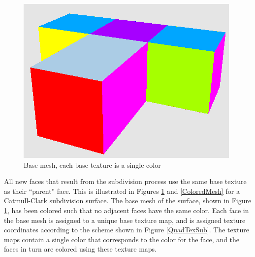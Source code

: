 \documentclass[10pt,twocolumn]{article}
\begin{document}

\begin{figure}
\begin{center}
\includegraphics[scale=0.5]{basemesh.png}
\caption{Base mesh, each base texture is a single color}
\label{ColoredBaseMesh}
\end{center}
\end{figure}

All new faces that result from the subdivision process use the same base 
texture as their ``parent'' face.  This is illustrated in Figures 
\ref{ColoredBaseMesh} and \ref{ColoredMesh} for a Catmull-Clark \cite{Catmull:1978:RGB} subdivision 
surface.  The base mesh of the surface, shown in Figure \ref{ColoredBaseMesh}, 
has been colored such that no adjacent faces have the same color.  
Each face in the base mesh is assigned to a unique base texture map, 
and is assigned texture coordinates according to the scheme shown in Figure \ref{QuadTexSub}. 
The texture maps contain a single color that corresponds to the color for the face,  
and the faces in turn are colored using these texture maps.
\end{document}
